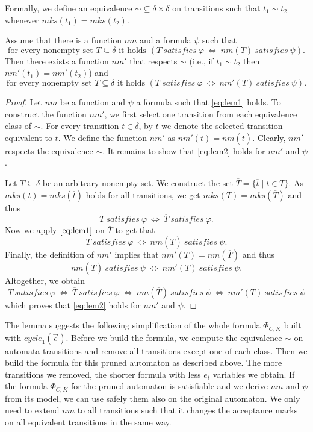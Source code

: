 \documentclass[a4paper,UKenglish,cleveref, autoref, thm-restate]{lipics-v2021}
\newcommand{\mks}{\mathit{mks}}
\newcommand{\rem}{\mathit{nm}}
\newcommand{\mcycle}{\mathit{cycle}}
\newcommand{\msat}{\mathit{satisfies}}
\begin{document}
Formally, we define an equivalence $\sim\subseteq\delta\times\delta$
on transitions such that $t_1\sim t_2$ whenever $\mks(t_1)=\mks(t_2)$.
\begin{lemma}
  Assume that there is a function $\rem$ and a formula $\psi$ such that 
  \[
    \textrm{for every nonempty set $T\subseteq\delta$ it holds }
      (T~\msat~\varphi~\iff~\rem(T)~\msat~\psi).\tag{$1$}\label{eq:lem1} 
  \]  
  Then there exists a function $\rem'$ that respects %
  $\sim$ (i.e.,
  if $t_1\sim t_2$ then $\rem'(t_1)=\rem'(t_2)$) and
  \[
    \textrm{for every nonempty set $T\subseteq\delta$ it holds }
    (T~\msat~\varphi~\iff~\rem'(T)~\msat~\psi).\tag{$2$}\label{eq:lem2} 
  \]  
\end{lemma}
\begin{proof}
  Let $\rem$ be a function and $\psi$ a formula such that
  \eqref{eq:lem1} holds. To construct the function $\rem'$, we first
  select one transition from each equivalence class of $\sim$. For
  every transition $t\in\delta$, by $\overline{t}$ we denote the
  selected transition equivalent to $t$. We define the function
  $\rem'$ as $\rem'(t)=\rem(\overline{t})$. Clearly, $\rem'$ respects
  the equivalence $\sim$. It remains to show that \eqref{eq:lem2}
  holds for $\rem'$ and $\psi$.

  Let $T\subseteq\delta$ be an arbitrary nonempty set. We construct
  the set $\overline{T}=\{\overline{t}\mid t\in T\}$. As
  $\mks(t)=\mks(\overline{t})$ holds for all transitions, we get
  $\mks(T)=\mks(\overline{T})$ and thus
  \[
    T~\msat~\varphi~\iff~\overline{T}~\msat~\varphi.
  \]
  Now we apply $\eqref{eq:lem1}$ on $\overline{T}$ to get that
  \[
    \overline{T}~\msat~\varphi~\iff~\rem(\overline{T})~\msat~\psi.
  \]
  Finally, the definition of $\rem'$ implies that
  $\rem'(T)=\rem(\overline{T})$ and thus
  \[
    \rem(\overline{T})~\msat~\psi~\iff~\rem'(T)~\msat~\psi.
  \]
  Altogether, we obtain
  \[
    T~\msat~\varphi~\iff~\overline{T}~\msat~\varphi~\iff~\rem(\overline{T})~\msat~\psi~\iff~\rem'(T)~\msat~\psi
  \]
  which proves that \eqref{eq:lem2} holds for $\rem'$ and $\psi$. 
\end{proof}

The lemma suggests the following simplification of the whole formula
$\Phi_{C,K}$ built with $\mcycle_1(\vec{e})$. Before we build the
formula, we compute the equivalence $\sim$ on automata transitions and
remove all transitions except one of each class. Then we build the
formula for this pruned automaton as described above. The more
transitions we removed, the shorter formula with less $e_t$ variables
we obtain. If the formula $\Phi_{C,K}$ for the pruned automaton is
satisfiable and we derive $\rem$ and $\psi$ from its model, we can use
safely them also on the original automaton. We only need to extend
$\rem$ to all transitions such that it changes the acceptance marks on
all equivalent transitions in the same way.
\end{document}

